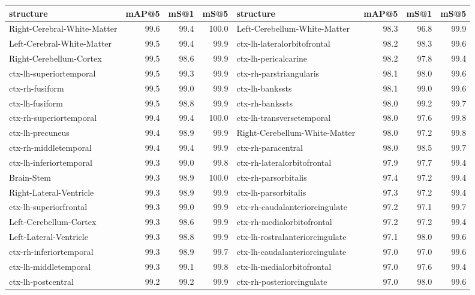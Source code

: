 \begin{tabular}{lrrrlrrr}
\toprule
structure & mAP@5 & mS@1 & mS@5 & structure & mAP@5 & mS@1 & mS@5 \\
\midrule
Right-Cerebral-White-Matter & 99.6 & 99.4 & 100.0 & Left-Cerebellum-White-Matter & 98.3 & 96.8 & 99.9 \\
Left-Cerebral-White-Matter & 99.5 & 99.4 & 99.9 & ctx-lh-lateralorbitofrontal & 98.2 & 98.3 & 99.6 \\
Right-Cerebellum-Cortex & 99.5 & 98.6 & 99.9 & ctx-lh-pericalcarine & 98.2 & 97.8 & 99.4 \\
ctx-lh-superiortemporal & 99.5 & 99.3 & 99.9 & ctx-rh-parstriangularis & 98.1 & 98.0 & 99.6 \\
ctx-rh-fusiform & 99.5 & 99.0 & 99.9 & ctx-lh-bankssts & 98.1 & 99.0 & 99.6 \\
ctx-lh-fusiform & 99.5 & 98.8 & 99.9 & ctx-rh-bankssts & 98.0 & 99.2 & 99.7 \\
ctx-rh-superiortemporal & 99.4 & 99.4 & 100.0 & ctx-lh-transversetemporal & 98.0 & 97.6 & 99.8 \\
ctx-lh-precuneus & 99.4 & 98.9 & 99.9 & Right-Cerebellum-White-Matter & 98.0 & 97.2 & 99.8 \\
ctx-rh-middletemporal & 99.4 & 99.4 & 99.9 & ctx-rh-paracentral & 98.0 & 98.5 & 99.7 \\
ctx-lh-inferiortemporal & 99.3 & 99.0 & 99.8 & ctx-rh-lateralorbitofrontal & 97.9 & 97.7 & 99.4 \\
Brain-Stem & 99.3 & 98.9 & 100.0 & ctx-rh-parsorbitalis & 97.4 & 97.2 & 99.4 \\
Right-Lateral-Ventricle & 99.3 & 98.9 & 99.9 & ctx-lh-parsorbitalis & 97.3 & 97.2 & 99.4 \\
ctx-lh-superiorfrontal & 99.3 & 99.0 & 99.9 & ctx-rh-caudalanteriorcingulate & 97.2 & 97.1 & 99.7 \\
Left-Cerebellum-Cortex & 99.3 & 98.6 & 99.9 & ctx-rh-medialorbitofrontal & 97.2 & 97.2 & 99.4 \\
Left-Lateral-Ventricle & 99.3 & 98.8 & 99.9 & ctx-lh-rostralanteriorcingulate & 97.1 & 98.0 & 99.6 \\
ctx-rh-inferiortemporal & 99.3 & 98.9 & 99.7 & ctx-lh-caudalanteriorcingulate & 97.0 & 97.0 & 99.6 \\
ctx-lh-middletemporal & 99.3 & 99.1 & 99.8 & ctx-lh-medialorbitofrontal & 97.0 & 97.6 & 99.4 \\
ctx-lh-postcentral & 99.2 & 99.2 & 99.9 & ctx-rh-posteriorcingulate & 97.0 & 98.0 & 99.6 \\

\end{tabular}
